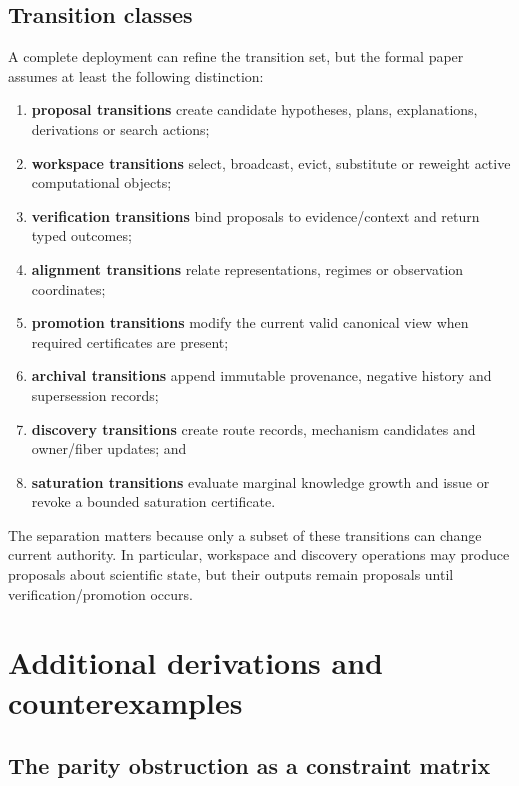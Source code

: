 \documentclass[11pt]{article}
\begin{document}
\subsection{Transition classes}

A complete deployment can refine the transition set, but the formal paper assumes at least the following distinction:

\begin{enumerate}[leftmargin=*]
\item \textbf{proposal transitions} create candidate hypotheses, plans, explanations, derivations or search actions;
\item \textbf{workspace transitions} select, broadcast, evict, substitute or reweight active computational objects;
\item \textbf{verification transitions} bind proposals to evidence/context and return typed outcomes;
\item \textbf{alignment transitions} relate representations, regimes or observation coordinates;
\item \textbf{promotion transitions} modify the current valid canonical view when required certificates are present;
\item \textbf{archival transitions} append immutable provenance, negative history and supersession records;
\item \textbf{discovery transitions} create route records, mechanism candidates and owner/fiber updates; and
\item \textbf{saturation transitions} evaluate marginal knowledge growth and issue or revoke a bounded saturation certificate.
\end{enumerate}

The separation matters because only a subset of these transitions can change current authority. In particular, workspace and discovery operations may produce proposals about scientific state, but their outputs remain proposals until verification/promotion occurs.

\section{Additional derivations and counterexamples}

\subsection{The parity obstruction as a constraint matrix}
\end{document}
